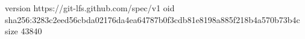 version https://git-lfs.github.com/spec/v1
oid sha256:3283c2eed56cbda02176da4ea64787b0f3cdb81e8198a885f218b4a570b73b4c
size 43840
